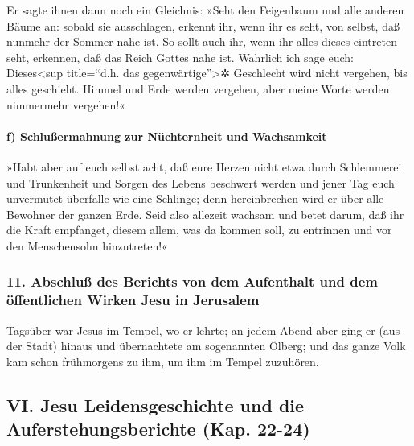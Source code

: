  Er sagte ihnen dann noch ein Gleichnis: »Seht den
Feigenbaum und alle anderen Bäume an:  sobald sie
ausschlagen, erkennt ihr, wenn ihr es seht, von selbst, daß nunmehr der
Sommer nahe ist.  So sollt auch ihr, wenn ihr alles
dieses eintreten seht, erkennen, daß das Reich Gottes nahe ist.
 Wahrlich ich sage euch: Dieses\textless sup title=``d.h.
das gegenwärtige''\textgreater✲ Geschlecht wird nicht vergehen, bis
alles geschieht.  Himmel und Erde werden vergehen, aber
meine Worte werden nimmermehr vergehen!«

\hypertarget{f-schluuxdfermahnung-zur-nuxfcchternheit-und-wachsamkeit}{%
\paragraph{f) Schlußermahnung zur Nüchternheit und
Wachsamkeit}\label{f-schluuxdfermahnung-zur-nuxfcchternheit-und-wachsamkeit}}

 »Habt aber auf euch selbst acht, daß eure Herzen nicht
etwa durch Schlemmerei und Trunkenheit und Sorgen des Lebens beschwert
werden und jener Tag euch unvermutet überfalle wie eine Schlinge;
 denn hereinbrechen wird er über alle Bewohner der ganzen
Erde.  Seid also allezeit wachsam und betet darum, daß
ihr die Kraft empfanget, diesem allem, was da kommen soll, zu entrinnen
und vor den Menschensohn hinzutreten!«

\hypertarget{abschluuxdf-des-berichts-von-dem-aufenthalt-und-dem-uxf6ffentlichen-wirken-jesu-in-jerusalem}{%
\subsubsection{11. Abschluß des Berichts von dem Aufenthalt und dem
öffentlichen Wirken Jesu in
Jerusalem}\label{abschluuxdf-des-berichts-von-dem-aufenthalt-und-dem-uxf6ffentlichen-wirken-jesu-in-jerusalem}}

 Tagsüber war Jesus im Tempel, wo er lehrte; an jedem
Abend aber ging er (aus der Stadt) hinaus und übernachtete am
sogenannten Ölberg;  und das ganze Volk kam schon
frühmorgens zu ihm, um ihm im Tempel zuzuhören.

\hypertarget{vi.-jesu-leidensgeschichte-und-die-auferstehungsberichte-kap.-22-24}{%
\subsection{VI. Jesu Leidensgeschichte und die Auferstehungsberichte
(Kap.
22-24)}\label{vi.-jesu-leidensgeschichte-und-die-auferstehungsberichte-kap.-22-24}}

